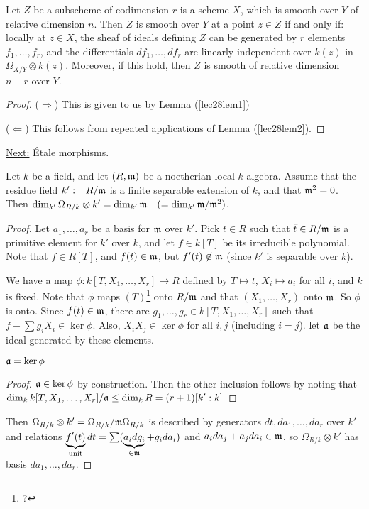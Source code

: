  \begin{theorem}
 Let $Z$ be a subscheme of codimension $r$ is a scheme $X$, which is smooth over $Y$
 of relative dimension $n$.  Then $Z$ is smooth over $Y$ at a point $z\in Z$ if and
 only if:
 locally at $z\in X$, the sheaf of ideals defining $Z$ can be generated by $r$
 elements $f_1,\dots, f_r$, and the differentials $df_1,\dots, df_r$ are linearly
 independent over $k(z)$ in $\Omega_{X/Y}\otimes k(z)$.  Moreover, if this hold, then
 $Z$ is smooth of relative dimension $n-r$ over $Y$.
 \end{theorem}
 \begin{proof}
 ($\Rightarrow$) This is given to us by Lemma (\ref{lec28lem1})

 ($\Leftarrow$) This follows from repeated applications of Lemma (\ref{lec28lem2}).
 \end{proof}

 \underline{Next:} \'{E}tale morphisms.

 \begin{lemma}
 Let $k$ be a field, and let $(R,\mathfrak{m})$ be a noetherian local $k$-algebra.  Assume that
 the residue field $k':=R/\mathfrak{m}$ is a finite separable extension of $k$, and that
 $\mathfrak{m}^2=0$.  Then $\dim_{k'}\Omega_{R/k}\otimes k' = \dim_{k'} \mathfrak{m}\quad (=\dim_{k'} \mathfrak{m}/\mathfrak{m}^2)$.
 \end{lemma}
 \begin{proof}
 Let $a_1,\dots, a_r$ be a basis for $\mathfrak{m}$ over $k'$.  Pick $t\in R$ such that $\bar t
 \in R/\mathfrak{m}$ is a primitive element for $k'$ over $k$, and let $f\in k[T]$ be its
 irreducible polynomial.  Note that $f\in R[T]$, and $f(t)\in \mathfrak{m}$, but $f'(t)\not\in
 \mathfrak{m}$ (since $k'$ is separable over $k$).

 We have a map $\phi:k[T,X_1,\dots, X_r] \to R$ defined by $T\mapsto t$, $X_i\mapsto
 a_i$ for all $i$, and $k$ is fixed.  Note that $\phi$ maps $(T)$\footnote{?} onto $R/\mathfrak{m}$ and that
 $(X_1,\dots,X_r)$ onto $\mathfrak{m}$.  So $\phi$ is onto.  Since $f(t)\in \mathfrak{m}$, there are
 $g_1,\dots, g_r\in k[T,X_1,\dots,X_r]$ such that $f-\sum g_i X_i \in \ker \phi$.
 Also, $X_i X_j \in \ker \phi$ for all $i,j$ (including $i=j$).  let $\mathfrak{a}$ be the
 ideal generated by these elements.
 \begin{claim}
 $\mathfrak{a} = \ker \phi$
 \end{claim}
 \begin{proof}
 $\mathfrak{a}\in \ker \phi$ by construction.  Then the other inclusion follows by noting that
 $\dim_k k[T,X_1,\dots,X_r]/\mathfrak{a} \le \dim_k R = (r+1)[k':k]$

 \renewcommand{\qedsymbol}{$\square_\text{\tiny Claim}$}
 \end{proof}

 Then $\Omega_{R/k}\otimes k' = \Omega_{R/k}/\mathfrak{m}\Omega_{R/k}$ is described by
 generators $dt,da_1,\dots,da_r$ over $k'$ and relations $\underbrace{f'(t)}_{\text{unit}}dt = \sum
 (\underbrace{a_idg_i}_{\in \mathfrak{m}}+g_ida_i)$ and $a_ida_j+a_jda_i\in \mathfrak{m}$, so
 $\Omega_{R/k}\otimes k'$ has basis $da_1,\dots, da_r$.
 \end{proof}
